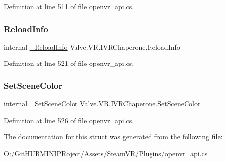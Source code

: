 Definition at line 511 of file openvr\+\_\+api.\+cs.

\mbox{\label{struct_valve_1_1_v_r_1_1_i_v_r_chaperone_a783f0aaa0cdb9747595300a48ebf49a0}} 
\subsubsection{\texorpdfstring{ReloadInfo}{ReloadInfo}}
{\footnotesize\ttfamily internal \mbox{\hyperlink{struct_valve_1_1_v_r_1_1_i_v_r_chaperone_a8de5e80b3169e3fa61c6bed940006796}{\+\_\+\+Reload\+Info}} Valve.\+V\+R.\+I\+V\+R\+Chaperone.\+Reload\+Info}



Definition at line 521 of file openvr\+\_\+api.\+cs.

\mbox{\label{struct_valve_1_1_v_r_1_1_i_v_r_chaperone_a4c43b34facc6450ec73f70dae7349fae}} 
\subsubsection{\texorpdfstring{SetSceneColor}{SetSceneColor}}
{\footnotesize\ttfamily internal \mbox{\hyperlink{struct_valve_1_1_v_r_1_1_i_v_r_chaperone_ac52b4f817e60c163ab42c6fbe71cd116}{\+\_\+\+Set\+Scene\+Color}} Valve.\+V\+R.\+I\+V\+R\+Chaperone.\+Set\+Scene\+Color}



Definition at line 526 of file openvr\+\_\+api.\+cs.



The documentation for this struct was generated from the following file\+:\begin{DoxyCompactItemize}
\item 
O\+:/\+Git\+H\+U\+B\+M\+I\+N\+I\+P\+Roject/\+Assets/\+Steam\+V\+R/\+Plugins/\mbox{\hyperlink{openvr__api_8cs}{openvr\+\_\+api.\+cs}}\end{DoxyCompactItemize}
